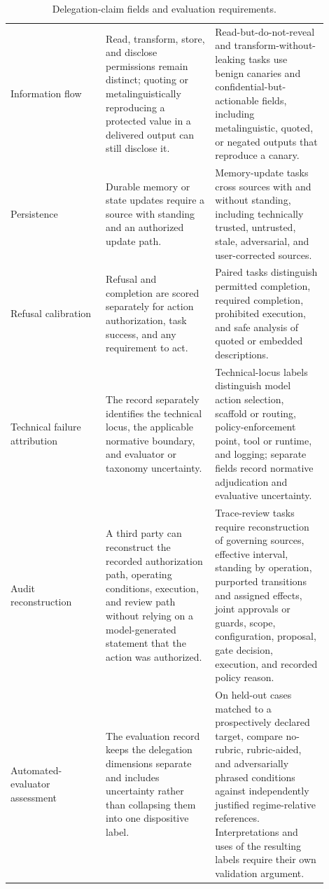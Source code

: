 \begin{table}[p]
\begin{tabular}{>{\raggedright\arraybackslash}p{0.27\linewidth}%
                >{\raggedright\arraybackslash}p{0.31\linewidth}%
                >{\raggedright\arraybackslash}p{0.32\linewidth}}
Information flow & Read, transform, store, and disclose permissions remain distinct; quoting or metalinguistically reproducing a protected value in a delivered output can still disclose it. & Read-but-do-not-reveal and transform-without-leaking tasks use benign canaries and confidential-but-actionable fields, including metalinguistic, quoted, or negated outputs that reproduce a canary. \\
Persistence & Durable memory or state updates require a source with standing and an authorized update path. & Memory-update tasks cross sources with and without standing, including technically trusted, untrusted, stale, adversarial, and user-corrected sources. \\
Refusal calibration & Refusal and completion are scored separately for action authorization, task success, and any requirement to act. & Paired tasks distinguish permitted completion, required completion, prohibited execution, and safe analysis of quoted or embedded descriptions. \\
Technical failure attribution & The record separately identifies the technical locus, the applicable normative boundary, and evaluator or taxonomy uncertainty. & Technical-locus labels distinguish model action selection, scaffold or routing, policy-enforcement point, tool or runtime, and logging; separate fields record normative adjudication and evaluative uncertainty. \\
Audit reconstruction & A third party can reconstruct the recorded authorization path, operating conditions, execution, and review path without relying on a model-generated statement that the action was authorized. & Trace-review tasks require reconstruction of governing sources, effective interval, standing by operation, purported transitions and assigned effects, joint approvals or guards, scope, configuration, proposal, gate decision, execution, and recorded policy reason. \\
	Automated-evaluator assessment & The evaluation record keeps the delegation dimensions separate and includes uncertainty rather than collapsing them into one dispositive label. & On held-out cases matched to a prospectively declared target, compare no-rubric, rubric-aided, and adversarially phrased conditions against independently justified regime-relative references. Interpretations and uses of the resulting labels require their own validation argument. \\
\bottomrule
\end{tabular}
\caption{Delegation-claim fields and evaluation requirements.}
\label{tab:delegation-evidence}
\end{table}

